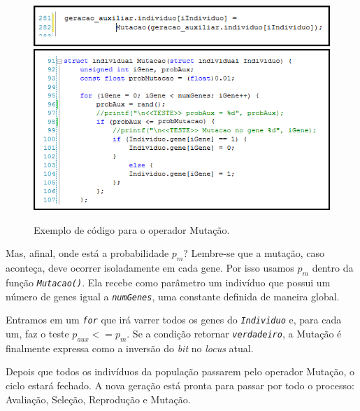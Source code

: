 	\begin{figure}[htp]
		\begin{center}
			\includegraphics[width=13cm]{figs/ga/CodigoMutacao.png}
			\includegraphics[width=13cm]{figs/ga/CodigoMutacaoFunc.png}
		\end{center}
		\caption{\label{figCodMutacao}Exemplo de código para o operador Mutação.}
	\end{figure}
		
	Mas, afinal, onde está a probabilidade $p_m$? Lembre-se que a mutação, caso aconteça, deve ocorrer isoladamente em cada gene. Por isso usamos $p_m$ dentro da função \textit{\texttt{Mutacao()}}. Ela recebe como parâmetro um indivíduo que possui um número de genes igual a \textit{\texttt{numGenes}}, uma constante definida de maneira global.
	
	Entramos em um \textit{\texttt{for}} que irá varrer todos os genes do \textit{\texttt{Individuo}} e, para cada um, faz o teste $p_{aux} <= p_m$. Se a condição retornar \textit{\texttt{verdadeiro}}, a Mutação é finalmente expressa como a inversão do \textit{bit} no \textit{locus} atual.
	
	Depois que todos os indivíduos da população passarem pelo operador Mutação, o ciclo estará fechado. A nova geração está pronta para passar por todo o processo: Avaliação, Seleção, Reprodução e Mutação.